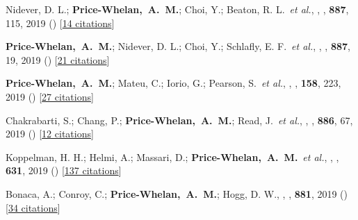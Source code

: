\item[{\color{deemph}\scriptsize58}]Nidever, D. L.; \textbf{Price-Whelan,~A.~M.}; Choi, Y.; Beaton, R. L.~\textit{et al.}, , \apj, \textbf{887}, 115, 2019 () [\href{http://adsabs.harvard.edu/abs/2019ApJ...887..115N}{14 citations}]

\item[{\color{deemph}\scriptsize57}]\textbf{Price-Whelan,~A.~M.}; Nidever, D. L.; Choi, Y.; Schlafly, E. F.~\textit{et al.}, , \apj, \textbf{887}, 19, 2019 () [\href{http://adsabs.harvard.edu/abs/2019ApJ...887...19P}{21 citations}]

\item[{\color{deemph}\scriptsize56}]\textbf{Price-Whelan,~A.~M.}; Mateu, C.; Iorio, G.; Pearson, S.~\textit{et al.}, , \aj, \textbf{158}, 223, 2019 () [\href{http://adsabs.harvard.edu/abs/2019AJ....158..223P}{27 citations}]

\item[{\color{deemph}\scriptsize55}]Chakrabarti, S.; Chang, P.; \textbf{Price-Whelan,~A.~M.}; Read, J.~\textit{et al.}, , \apj, \textbf{886}, 67, 2019 () [\href{http://adsabs.harvard.edu/abs/2019ApJ...886...67C}{12 citations}]

\item[{\color{deemph}\scriptsize54}]Koppelman, H. H.; Helmi, A.; Massari, D.; \textbf{Price-Whelan,~A.~M.}~\textit{et al.}, , \aanda, \textbf{631}, 2019 () [\href{http://adsabs.harvard.edu/abs/2019A&A...631L...9K}{137 citations}]

\item[{\color{deemph}\scriptsize53}]Bonaca, A.; Conroy, C.; \textbf{Price-Whelan,~A.~M.}; Hogg, D. W., , \apj, \textbf{881}, 2019 () [\href{http://adsabs.harvard.edu/abs/2019ApJ...881L..37B}{34 citations}]

